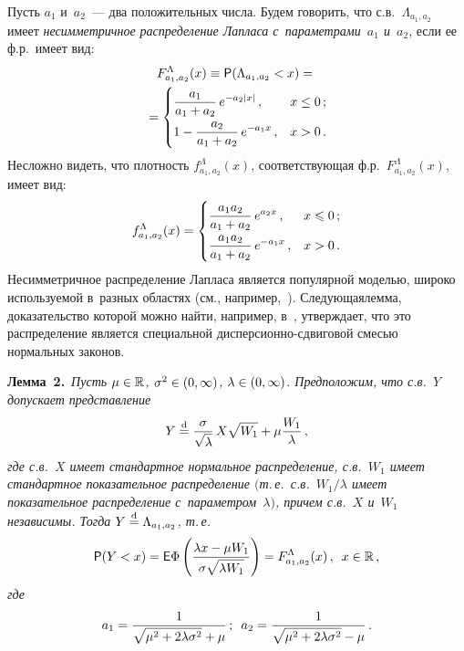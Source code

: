\begin{multicols}{2}
Пусть $a_1$ и~$a_2$~--- два положительных числа. Будем говорить, что
с.в.~$\Lambda_{a_1,a_2}$ имеет \textit{несимметричное распределение
Лапласа с~параметрами~$a_1$ и~$a_2$}, если ее ф.р.\ имеет вид:
\begin{multline*}
F^{\Lambda}_{a_1,a_2}(x)\equiv {\sf P}(\Lambda_{a_1,a_2}<x) ={}\\
{}=
\begin{cases}
\displaystyle\displaystyle\frac{\displaystyle a_1 \mathstrut}{\displaystyle a_1+a_2\mathstrut}\, e^{-a_2|x|}\,, & x\leq0\,; \\
\displaystyle 1-\displaystyle\frac{\displaystyle a_2\mathstrut}{\displaystyle a_1+a_2\mathstrut}\, e^{-a_1x}\,, & x> 0\,.
\end{cases}
\end{multline*}
Несложно видеть, что плотность $f^{\Lambda}_{a_1,a_2}(x)$,
соответствующая ф.р.~$F^{\Lambda}_{a_1,a_2}(x)$, имеет вид:
$$
f^{\Lambda}_{a_1,a_2}(x)=
\begin{cases}
\displaystyle\displaystyle\frac{\displaystyle a_1 a_2\mathstrut}{\displaystyle a_1+a_2\mathstrut}\, e^{a_2
x}\,,& x\leqslant 0\,;\\
\displaystyle \displaystyle\frac{\displaystyle a_1 a_2\mathstrut}{\displaystyle a_1+a_2\mathstrut}\, e^{-a_1 x}\,,&
x>0\,.
\end{cases}
$$
Несимметричное распределение Лапласа является популярной моделью,
широко используемой в~разных областях (см., например,~\cite{Kotz2001}). 
Следующая\linebreak лемма, доказательство которой можно
найти, например, в~\cite{KorolevKurmangazievaZeifman2016},
утверждает, что это распределение является специальной
дис\-пер\-си\-он\-но-сдви\-го\-вой смесью нормальных законов.

\smallskip

\noindent
\textbf{Лемма~2.}\ \textit{Пусть $\mu\hm\in\mathbb{R}$, $\sigma^2\hm\in(0,\infty)$,
$\lambda\hm\in(0,\infty)$. Предположим, что с.в.~$Y$ допускает
представление}
$$
Y\stackrel{\mathrm{d}}{=} \displaystyle\frac{\displaystyle \sigma\mathstrut}{\displaystyle \sqrt{\lambda}\mathstrut}\,
X\sqrt{W_1}+\mu \displaystyle\frac{\displaystyle W_1\mathstrut}{\displaystyle \lambda\mathstrut}\,,
$$
\textit{где с.в.~$X$ имеет стандартное нормальное распределение, 
с.в.~$W_1$ имеет стандартное показательное распределение $($т.\,е.\ 
с.в.~$W_1/\lambda$ имеет показательное распределение с~параметром~$\lambda)$, 
причем с.в.~$X$ и~$W_1$ независимы. Тогда
$Y\stackrel{\mathrm{d}}{=}\Lambda_{a_1,a_2}$, т.\,е.}
$$
{\sf P}(Y<x)={\sf E}\Phi\left(\displaystyle\frac{\displaystyle \lambda x-\mu
W_1\mathstrut}{\displaystyle \sigma\sqrt{\lambda W_1}\mathstrut}\right)=F^{\Lambda}_{a_1,a_2}(x)\,,\enskip
x\in\mathbb{R}\,,
$$
\textit{где}
$$
a_1=\displaystyle\frac{\displaystyle 1\mathstrut}{\displaystyle \sqrt{\mu^2+2\lambda\sigma^2}+\mu\mathstrut}\,;\enskip
a_2=\displaystyle\frac{\displaystyle 1\mathstrut}{\displaystyle \sqrt{\mu^2+2\lambda\sigma^2}-\mu\mathstrut}\,.
\label{e14-kz}
$$

\smallskip


\end{multicols}
